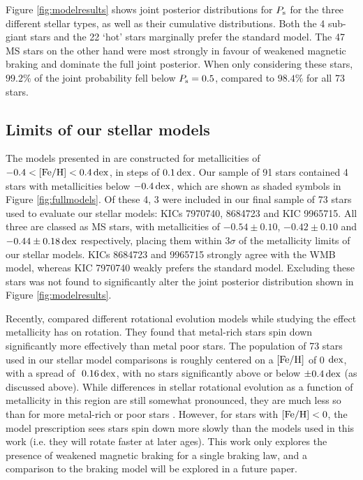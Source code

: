 Figure \ref{fig:modelresults} shows joint posterior distributions for $P_{\rm s}$ for the three different stellar types, as well as their cumulative distributions. Both the  4 sub-giant stars and the 22 `hot' stars marginally prefer the standard model. The 47 MS stars on the other hand were most strongly in favour of weakened magnetic braking and dominate the full joint posterior. When only considering these stars, $99.2\%$ of the joint probability fell below $P_{\rm{s}} = 0.5$, compared to $98.4\%$ for all 73 stars.

\subsection{Limits of our stellar models}\label{ssec:limits}
The models presented in \cite{vansaders+2019} are constructed for metallicities of $-0.4 < \rm{[Fe/H]} < 0.4\, \rm{dex}$, in steps of $0.1\, \rm {dex}$. Our sample of 91 stars contained 4 stars with metallicities below $-0.4\, \rm{dex}$, which are shown as shaded symbols in Figure \ref{fig:fullmodels}. Of these 4, 3 were included in our final sample of 73 stars used to evaluate our stellar models: KICs 7970740, 8684723 and KIC 9965715. All three are classed as MS stars, with metallicities of $-0.54 \pm 0.10$, $-0.42 \pm 0.10$ and $-0.44 \pm 0.18\, \rm {dex}$ respectively, placing them within $3\sigma$ of the metallicity limits of our stellar models. KICs 8684723 and 9965715 strongly agree with the WMB model, whereas KIC 7970740 weakly prefers the standard model. Excluding these stars was not found to significantly alter the joint posterior distribution shown in Figure \ref{fig:modelresults}.

Recently, \cite{amard+matt2020} compared different rotational evolution models \cite[][of which we use the former in this work]{vansaders+pinsonneault2013,matt+2015} while studying the effect metallicity has on rotation. They found that metal-rich stars spin down significantly more effectively than metal poor stars. The population of 73 stars used in our stellar model comparisons is roughly centered on a $\rm{[Fe/H]}$ of 0 $\rm dex$, with a spread of $~0.16\, \rm dex$, with no stars significantly above or below $\pm 0.4\, \rm dex$ (as discussed above). While differences in stellar rotational evolution as a function of metallicity in this region are still somewhat pronounced, they are much less so than for more metal-rich or poor stars \cite[see Figure 2][]{amard+matt2020}. However, for stars with $\mbox{$\rm{[Fe/H]}$} < 0$, the \cite{matt+2015} model prescription sees stars spin down more slowly than the models used in this work (i.e. they will rotate faster at later ages). This work only explores the presence of weakened magnetic braking for a single braking law, and a comparison to the \cite{matt+2015} braking model will be explored in a future paper.

